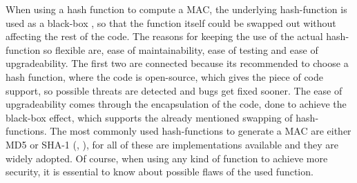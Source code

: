 When using a hash function to compute a MAC, the underlying hash-function is used as a black-box \cite{KHF}, so that the function itself could be swapped out without affecting the rest of the code. The reasons for keeping the use of the actual hash-function so flexible are, ease of maintainability, ease of testing and ease of upgradeability. The first two are connected because its recommended to choose a hash function, where the code is open-source, which gives the piece of code support, so possible threats are detected and bugs get fixed sooner. The ease of upgradeability comes through the encapsulation of the code, done to achieve the black-box effect, which supports the already mentioned swapping of hash-functions.
The most commonly used hash-functions to generate a MAC are either MD5 or SHA-1 (\cite{CRY-MD5}, \cite{NPC}), for all of these are implementations available and they are widely adopted. Of course, when using any kind of function to achieve more security, it is essential to know about possible flaws of the used function. 
